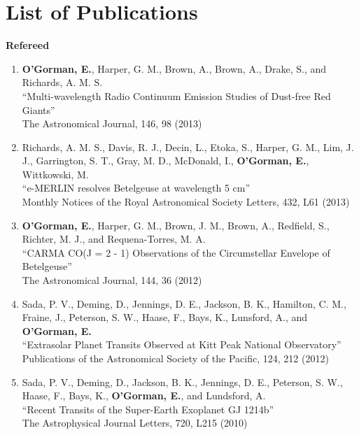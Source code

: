 \chapter{List of Publications}
\label{chapter:publications}


{\large \textbf{Refereed}}

\begin{enumerate}
\item \textbf{O'Gorman, E.}, Harper, G. M., Brown, A., Brown, A., Drake, S., and Richards, A. M. S.\\
``Multi-wavelength Radio Continuum Emission Studies of Dust-free Red Giants''\\
The Astronomical Journal, 146, 98 (2013)

\item Richards, A. M. S., Davis, R. J., Decin, L., Etoka, S., Harper, G. M., Lim, J. J., Garrington, S. T., Gray, M. D., McDonald, I., \textbf{O'Gorman, E.}, Wittkowski, M.\\
``e-MERLIN resolves Betelgeuse at wavelength 5 cm''\\
Monthly Notices of the Royal Astronomical Society Letters, 432, L61 (2013)

\item \textbf{O'Gorman, E.}, Harper, G. M., Brown, J. M., Brown, A., Redfield, S., Richter, M. J., and Requena-Torres, M. A.\\
``CARMA CO(J = 2 - 1) Observations of the Circumstellar Envelope of Betelgeuse''\\
The Astronomical Journal, 144, 36 (2012)

\item Sada, P. V., Deming, D., Jennings, D. E., Jackson, B. K., Hamilton, C. M., Fraine, J., Peterson, S. W., Haase, F., Bays, K., Lunsford, A., and \textbf{O'Gorman, E.}\\
``Extrasolar Planet Transits Observed at Kitt Peak National Observatory''\\
Publications of the Astronomical Society of the Pacific, 124, 212 (2012)

\item Sada, P. V., Deming, D., Jackson, B. K., Jennings, D. E., Peterson, S. W., Haase, F., Bays, K., \textbf{O'Gorman, E.}, and Lundsford, A.\\
``Recent Transits of the Super-Earth Exoplanet GJ 1214b''\\
The Astrophysical Journal Letters, 720, L215 (2010)
\end{enumerate}


